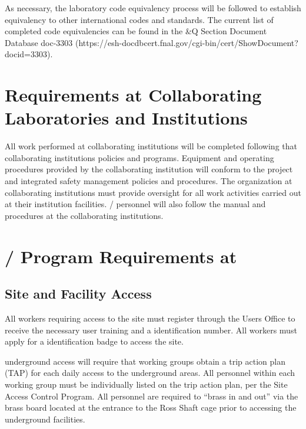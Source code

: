 As necessary, the laboratory code equivalency process will be followed
to establish equivalency to other international codes and
standards. The current list of completed code equivalencies can be
found in the \&Q Section Document Database doc-3303
(https://esh-docdbcert.fnal.gov/cgi-bin/cert/ShowDocument?docid=3303).


\section{ Requirements at Collaborating Laboratories and Institutions}

All work performed at collaborating institutions will be completed
following that collaborating institutions  policies and
programs. Equipment and operating procedures provided by the
collaborating institution will conform to the  project
 and integrated safety management policies and
procedures. The  organization at collaborating institutions
must provide  oversight for all work activities carried
out at their institution facilities. /
personnel will also follow the  manual and procedures at
the collaborating institutions.

\section{/  Program Requirements at }

\subsection{Site and Facility Access}

All  workers requiring access to the  site must
register through the \fnal Users Office to receive the necessary user
training and a \fnal identification number. All workers must apply for
a  identification badge to access the  site.

 underground access will require that working groups
obtain a trip action plan (TAP) for each daily access to the
underground areas.  All personnel within each working group must be
individually listed on the trip action plan, per the  Site
Access Control Program.  All personnel are
required to ``brass in and out'' via the brass board located at the
entrance to the Ross Shaft cage prior to accessing the underground
facilities.

